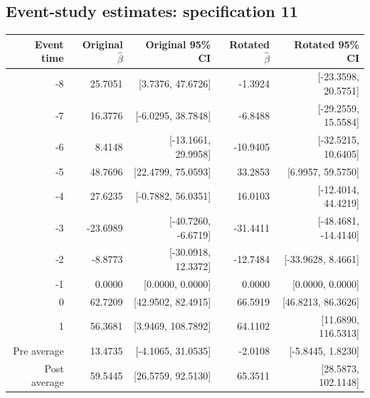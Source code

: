 \documentclass[10pt]{article}
\begin{document}
\subsection*{Event-study estimates: specification 11}
\begin{center}\scriptsize
\begin{tabular}{r rr rr}
\toprule
Event time & Original $\hat\beta$ & Original 95\% CI & Rotated $\hat\beta$ & Rotated 95\% CI \\
\midrule
-8 & 25.7051 & [3.7376, 47.6726] & -1.3924 & [-23.3598, 20.5751] \\
-7 & 16.3776 & [-6.0295, 38.7848] & -6.8488 & [-29.2559, 15.5584] \\
-6 & 8.4148 & [-13.1661, 29.9958] & -10.9405 & [-32.5215, 10.6405] \\
-5 & 48.7696 & [22.4799, 75.0593] & 33.2853 & [6.9957, 59.5750] \\
-4 & 27.6235 & [-0.7882, 56.0351] & 16.0103 & [-12.4014, 44.4219] \\
-3 & -23.6989 & [-40.7260, -6.6719] & -31.4411 & [-48.4681, -14.4140] \\
-2 & -8.8773 & [-30.0918, 12.3372] & -12.7484 & [-33.9628, 8.4661] \\
-1 & 0.0000 & [0.0000, 0.0000] & 0.0000 & [0.0000, 0.0000] \\
0 & 62.7209 & [42.9502, 82.4915] & 66.5919 & [46.8213, 86.3626] \\
1 & 56.3681 & [3.9469, 108.7892] & 64.1102 & [11.6890, 116.5313] \\
\midrule
Pre average & 13.4735 & [-4.1065, 31.0535] & -2.0108 & [-5.8445, 1.8230] \\
Post average & 59.5445 & [26.5759, 92.5130] & 65.3511 & [28.5873, 102.1148] \\
\bottomrule
\end{tabular}
\end{center}
\clearpage
\end{document}
